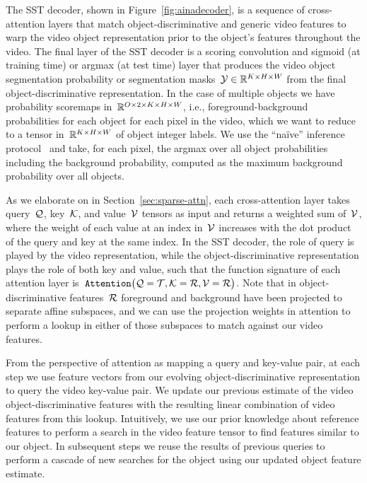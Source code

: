 The SST decoder, shown in Figure~\ref{fig:ainadecoder}, is a sequence of
cross-attention layers that match object-discriminative and generic video
features to warp the video object representation prior to the object's features
throughout the video.
The final layer of the SST decoder is a scoring convolution and sigmoid (at
training time) or argmax (at test time) layer that produces the video object
segmentation probability or segmentation
masks~$\mathcal{Y}{} \in \mathbb{R}{}^{K\times H\times W}$ from the final
object-discriminative representation.
In the case of multiple objects we have probability scoremaps
in~$\mathbb{R}{}^{O\times 2\times K\times H\times W}$, i.e., foreground-background
probabilities for each object for each pixel in the video, which we want to
reduce to a tensor in~$\mathbb{R}{}^{K\times H\times W}$ of object integer labels.
We use the ``na\"ive'' inference protocol~\citep{oh2018fast} and take, for each
pixel, the argmax over all object probabilities including the background
probability, computed as the maximum background probability over all objects.

As we elaborate on in Section~\ref{sec:sparse-attn}, each cross-attention layer
takes query~$\mathcal{Q}{}$, key~$\mathcal{K}{}$, and value~$\mathcal{V}{}$
tensors as input and returns a weighted sum of~$\mathcal{V}{}$, where the
weight of each value at an index in~$\mathcal{V}{}$ increases with the dot
product of the query and key at the same index.
In the SST decoder, the role of query is played by the video representation,
while the object-discriminative representation plays the role of both key and
value, such that the function signature of each attention layer
is~$\mathtt{Attention}\big(\mathcal{Q}{} = \mathcal{T}{}, \mathcal{K}{} = \mathcal{R}{}, \mathcal{V}{} = \mathcal{R}{}\big)$.
Note that in object-discriminative features~$\mathcal{R}{}$ foreground and
background have been projected to separate affine subspaces, and we can use the
projection weights in attention to perform a lookup in either of those
subspaces to match against our video features.

From the perspective of attention as mapping a query and key-value pair, at
each step we use feature vectors from our evolving object-discriminative
representation to query the video key-value pair.
We update our previous estimate of the video object-discriminative features
with the resulting linear combination of video features from this lookup.
Intuitively, we use our prior knowledge about reference features to perform a
search in the video feature tensor to find features similar to our object.
In subsequent steps we reuse the results of previous queries to perform a
cascade of new searches for the object using our updated object feature
estimate.

